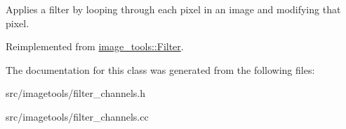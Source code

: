 Applies a filter by looping through each pixel in an image and modifying that pixel. 

Reimplemented from \hyperlink{classimage__tools_1_1Filter_a68d38fa12b87e20b81090cb380c0a307}{image\+\_\+tools\+::\+Filter}.



The documentation for this class was generated from the following files\+:\begin{DoxyCompactItemize}
\item 
src/imagetools/filter\+\_\+channels.\+h\item 
src/imagetools/filter\+\_\+channels.\+cc\end{DoxyCompactItemize}
